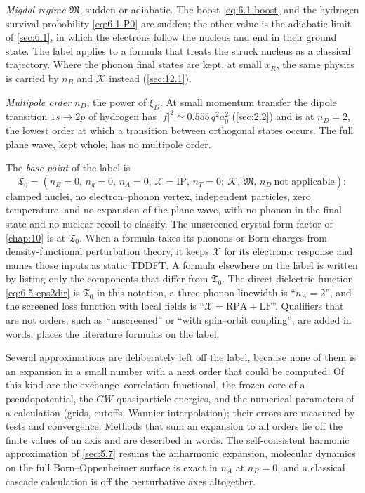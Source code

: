 \emph{Migdal regime $\mathfrak{M}$}, sudden or adiabatic. The boost \cref{eq:6.1-boost} and the hydrogen survival probability \cref{eq:6.1-P0} are sudden; the other value is the adiabatic limit of \cref{sec:6.1}, in which the electrons follow the nucleus and end in their ground state. The label applies to a formula that treats the struck nucleus as a classical trajectory. Where the phonon final states are kept, at small $x_R$, the same physics is carried by $n_B$ and $\mathcal{K}$ instead (\cref{sec:12.1}).

\emph{Multipole order $n_D$}, the power of $\xi_D$. At small momentum transfer the dipole transition $1s \to 2p$ of hydrogen has $|f|^2 \simeq 0.555\,q^2a_0^2$ (\cref{sec:2.2}) and is at $n_D = 2$, the lowest order at which a transition between orthogonal states occurs. The full plane wave, kept whole, has no multipole order.

The \emph{base point} of the label is
\begin{equation}
  \mathfrak{T}_0 = (n_B = 0,\, n_g = 0,\, n_A = 0,\, \mathcal{X} = \mathrm{IP},\, n_T = 0;\ \mathcal{K},\, \mathfrak{M},\, n_D\ \text{not applicable}) :
  \label{eq:8.5-base}
\end{equation}
clamped nuclei, no electron--phonon vertex, independent particles, zero temperature, and no expansion of the plane wave, with no phonon in the final state and no nuclear recoil to classify. The unscreened crystal form factor of \cref{chap:10} is at $\mathfrak{T}_0$. When a formula takes its phonons or Born charges from density-functional perturbation theory, it keeps $\mathcal{X}$ for its electronic response and names those inputs as static TDDFT. A formula elsewhere on the label is written by listing only the components that differ from $\mathfrak{T}_0$. The direct dielectric function \cref{eq:6.5-eps2dir} is $\mathfrak{T}_0$ in this notation, a three-phonon linewidth is ``$n_A = 2$'', and the screened loss function with local fields is ``$\mathcal{X} = \mathrm{RPA + LF}$''. Qualifiers that are not orders, such as ``unscreened'' or ``with spin--orbit coupling'', are added in words.  places the literature formulas on the label.

Several approximations are deliberately left off the label, because none of them is an expansion in a small number with a next order that could be computed. Of this kind are the exchange--correlation functional, the frozen core of a pseudopotential, the $GW$ quasiparticle energies, and the numerical parameters of a calculation (grids, cutoffs, Wannier interpolation); their errors are measured by tests and convergence. Methods that sum an expansion to all orders lie off the finite values of an axis and are described in words. The self-consistent harmonic approximation of \cref{sec:5.7} resums the anharmonic expansion, molecular dynamics on the full Born--Oppenheimer surface is exact in $n_A$ at $n_B = 0$, and a classical cascade calculation is off the perturbative axes altogether.

